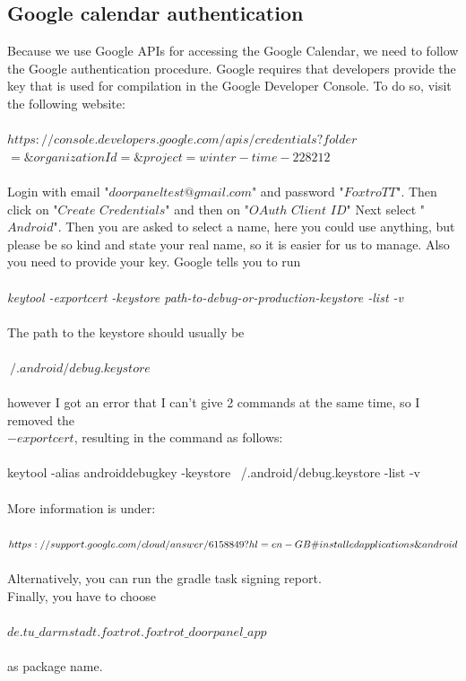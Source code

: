 \documentclass[article,colorback,accentcolor=tud4c, 11pt]{tudreport}
\begin{document}
\subsection{Google calendar authentication}

Because we use Google APIs for accessing the Google Calendar, we need to follow the Google authentication procedure.
Google requires that developers provide the key that is used for compilation in the Google Developer Console.
To do so, visit the following website:\\ \\
$https://console.developers.google.com/apis/credentials?folder$\\$=\&organizationId=\&project=winter-time-228212$ \\ \\
Login with email "$doorpaneltest@gmail.com$" and password "$FoxtroTT$".
Then click on "$Create$ $Credentials$" and then on "$OAuth$ $Client$ $ID$" Next select "$Android$".
Then you are asked to select a name, here you could use anything, but please be so kind and state your real name, so it is easier for us to manage.
Also you need to provide your key. Google tells you to run\\ \\
\textit{keytool -exportcert -keystore path-to-debug-or-production-keystore -list -v} \\ \\
The path to the keystore should usually be\\ \\ $~/.android/debug.keystore$ \\ \\
however I got an error that I can't give 2 commands at the same time, so I removed the \\$-exportcert$,  resulting in the command as follows:\\ \\
keytool -alias androiddebugkey -keystore ~/.android/debug.keystore -list -v\\ \\
More information is under:\\ \\
$https://support.google.com/cloud/answer/6158849?hl=en-GB\#\\installedapplications\&android$\\ \\
Alternatively, you can run the gradle task signing report. \\
Finally, you have to choose\\ \\$de.tu\_darmstadt.foxtrot.foxtrot\_doorpanel\_app$\\ \\ as package name.	
\end{document}

